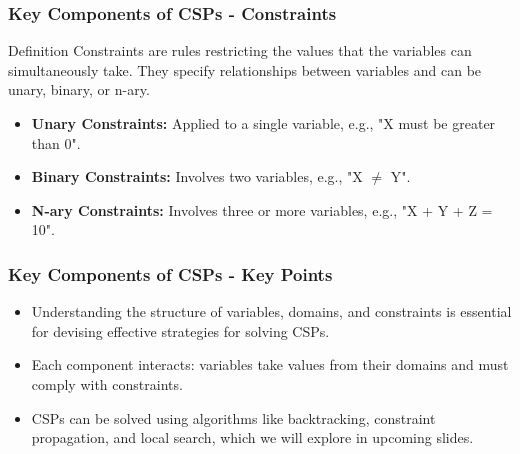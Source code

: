 \documentclass[aspectratio=169]{beamer}
\begin{document}
\begin{frame}[fragile]
    \frametitle{Key Components of CSPs - Constraints}
    \begin{block}{Definition}
        Constraints are rules restricting the values that the variables can simultaneously take. They specify relationships between variables and can be unary, binary, or n-ary.
    \end{block}
    
    \begin{itemize}
        \item \textbf{Unary Constraints:} Applied to a single variable, e.g., "X must be greater than 0".
        \item \textbf{Binary Constraints:} Involves two variables, e.g., "X $\neq$ Y".
        \item \textbf{N-ary Constraints:} Involves three or more variables, e.g., "X + Y + Z = 10".
    \end{itemize}
\end{frame}

\begin{frame}[fragile]
    \frametitle{Key Components of CSPs - Key Points}
    \begin{itemize}
        \item Understanding the structure of variables, domains, and constraints is essential for devising effective strategies for solving CSPs.
        \item Each component interacts: variables take values from their domains and must comply with constraints.
        \item CSPs can be solved using algorithms like backtracking, constraint propagation, and local search, which we will explore in upcoming slides.
    \end{itemize}
\end{frame}
\end{document}
